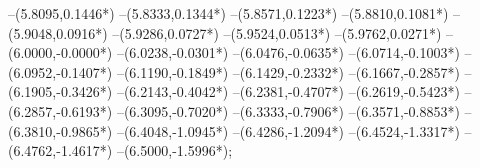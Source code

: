 {	--(5.8095,{0.1446*\yskala})
	--(5.8333,{0.1344*\yskala})
	--(5.8571,{0.1223*\yskala})
	--(5.8810,{0.1081*\yskala})
	--(5.9048,{0.0916*\yskala})
	--(5.9286,{0.0727*\yskala})
	--(5.9524,{0.0513*\yskala})
	--(5.9762,{0.0271*\yskala})
	--(6.0000,{-0.0000*\yskala})
	--(6.0238,{-0.0301*\yskala})
	--(6.0476,{-0.0635*\yskala})
	--(6.0714,{-0.1003*\yskala})
	--(6.0952,{-0.1407*\yskala})
	--(6.1190,{-0.1849*\yskala})
	--(6.1429,{-0.2332*\yskala})
	--(6.1667,{-0.2857*\yskala})
	--(6.1905,{-0.3426*\yskala})
	--(6.2143,{-0.4042*\yskala})
	--(6.2381,{-0.4707*\yskala})
	--(6.2619,{-0.5423*\yskala})
	--(6.2857,{-0.6193*\yskala})
	--(6.3095,{-0.7020*\yskala})
	--(6.3333,{-0.7906*\yskala})
	--(6.3571,{-0.8853*\yskala})
	--(6.3810,{-0.9865*\yskala})
	--(6.4048,{-1.0945*\yskala})
	--(6.4286,{-1.2094*\yskala})
	--(6.4524,{-1.3317*\yskala})
	--(6.4762,{-1.4617*\yskala})
	--(6.5000,{-1.5996*\yskala});
}
